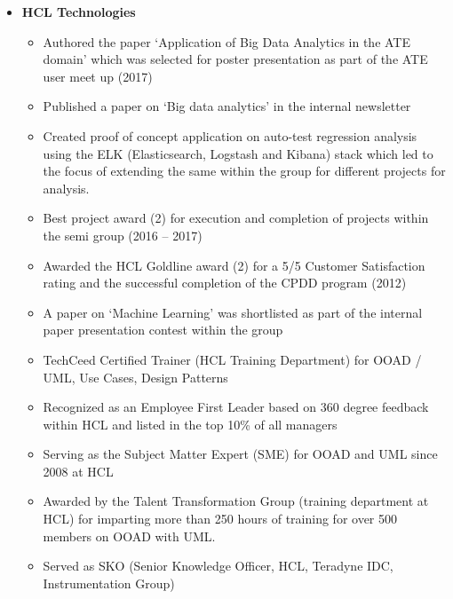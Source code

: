 \documentclass[a4paper,12pt]{article}
\begin{document}
\begin{itemize}
  \item{\bf{HCL Technologies}}
    
    \begin{itemize}
      \setlength\itemsep{-0.5em}
      \item Authored the paper `Application of Big Data Analytics in
        the ATE domain' which was selected for poster presentation as
        part of the ATE user meet up (2017)
      \item Published a paper on `Big data analytics' in the internal
        newsletter

      \item Created proof of concept application on auto-test
        regression analysis using the ELK (Elasticsearch, Logstash and
        Kibana) stack which led to the focus of extending the same
        within the group for different projects for analysis.

      \item Best project award (2) for execution and completion of
        projects within the semi group (2016 – 2017)

      \item Awarded the HCL Goldline award (2) for a 5/5 Customer
        Satisfaction rating and the successful completion of the CPDD
        program (2012)

      \item A paper on `Machine Learning' was shortlisted as part of
        the internal paper presentation contest within the group

      \item TechCeed Certified Trainer (HCL Training Department) for
        OOAD / UML, Use Cases, Design Patterns

      \item Recognized as an Employee First Leader based on 360 degree
        feedback within HCL and listed in the top 10\% of all managers

      \item Serving as the Subject Matter Expert (SME) for OOAD and
        UML since 2008 at HCL

      \item Awarded by the Talent Transformation Group (training
        department at HCL) for imparting more than 250 hours of
        training for over 500 members on OOAD with UML.

      \item Served as SKO (Senior Knowledge Officer, HCL, Teradyne
        IDC, Instrumentation Group)


\end{itemize}
\end{itemize}
\end{document}
